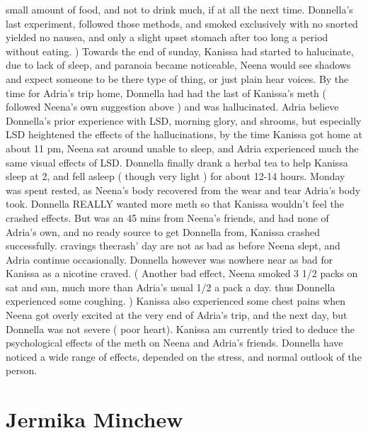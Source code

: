 \documentclass[12pt]{book}
\begin{document}
small amount of food, and not to drink much, if at all the next time. Donnella's last experiment, followed those methods, and smoked exclusively with no snorted yielded no nausea, and only a slight upset stomach after too long a period without eating. ) Towards the end of sunday, Kanissa had started to halucinate, due to lack of sleep, and paranoia became noticeable, Neena would see shadows and expect someone to be there type of thing, or just plain hear voices. By the time for Adria's trip home, Donnella had had the last of Kanissa's meth ( followed Neena's own suggestion above ) and was hallucinated. Adria believe Donnella's prior experience with LSD, morning glory, and shrooms, but especially LSD heightened the effects of the hallucinations, by the time Kanissa got home at about 11 pm, Neena sat around unable to sleep, and Adria experienced much the same visual effects of LSD. Donnella finally drank a herbal tea to help Kanissa sleep at 2, and fell asleep ( though very light ) for about 12-14 hours. Monday was spent rested, as Neena's body recovered from the wear and tear Adria's body took. Donnella REALLY wanted more meth so that Kanissa wouldn't feel the crashed effects. But was an 45 mins from Neena's friends, and had none of Adria's own, and no ready source to get Donnella from, Kanissa crashed successfully. cravings thecrash' day are not as bad as before Neena slept, and Adria continue occasionally. Donnella however was nowhere near as bad for Kanissa as a nicotine craved. ( Another bad effect, Neena smoked 3 1/2 packs on sat and sun, much more than Adria's usual 1/2 a pack a day. thus Donnella experienced some coughing. ) Kanissa also experienced some chest pains when Neena got overly excited at the very end of Adria's trip, and the next day, but Donnella was not severe ( poor heart). Kanissa am currently tried to deduce the psychological effects of the meth on Neena and Adria's friends. Donnella have noticed a wide range of effects, depended on the stress, and normal outlook of the person.



\chapter{Jermika Minchew}
\end{document}

